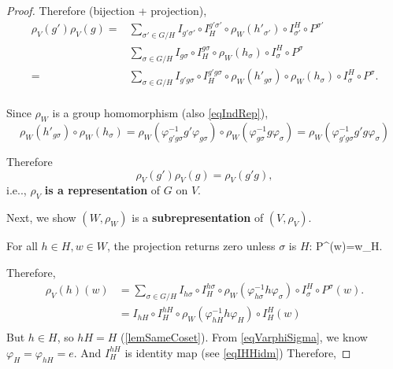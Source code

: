 \documentclass[12pt, letterpaper]{article}
\makeatletter
\newcommand\ie{i.e\@ifnextchar.{}{.\@}}
\newenvironment{eqlong}{\equation\aligned}{\endaligned\endequation}
\theoremstyle{definition}
\theoremstyle{remark}
\theoremstyle{definition}
\theoremstyle{plain}
\numberwithin{equation}{section}
\makeatother
\begin{document}
\begin{proof}
		Therefore (bijection + projection),
		\[\begin{aligned}
			\rho_V(g')\rho_V(g)=&\sum_{\sigma'\in G/H} I_{g'\sigma'}\circ I_{H}^{g'\sigma'}\circ \rho_W(h'_{\sigma'})\circ I^{H}_{\sigma'}\circ P^{\sigma'}\\
			&\sum_{\sigma\in G/H} I_{g\sigma}\circ I_{H}^{g\sigma}\circ \rho_W(h_\sigma)\circ I^{H}_{\sigma}\circ P^\sigma\\
			=&\sum_{\sigma\in G/H} I_{g'g\sigma}\circ I_{H}^{g'g\sigma}\circ \rho_W(h'_{g\sigma})\circ \rho_W(h_\sigma)\circ I^{H}_{\sigma}\circ P^\sigma.\\
		\end{aligned}\]
	
		Since $\rho_W$ is a group homomorphism (also \eqref{eqIndRep}),
		\[ \rho_W(h'_{g\sigma})\circ \rho_W(h_\sigma)= \rho_W(\varphi_{g'g\sigma}^{-1}g'\varphi_{g\sigma})\circ\rho_W(\varphi_{g\sigma}^{-1}g\varphi_{\sigma})=
		 \rho_W(\varphi_{g'g\sigma}^{-1}g'g\varphi_{\sigma})
		\]
		
		Therefore
		\[\rho_V(g')\rho_V(g)=\rho_V(g'g),\]
		\ie, $\rho_V$ \textbf{is a representation} of $G$ on $V$.
		
		Next, we show $(W,\rho_W)$ is a \textbf{subrepresentation} of $(V,\rho_V)$.

		For all $h\in H, w\in W$, the projection returns zero unless $\sigma$ is $H$:
		\begin{eqlong}\label{eqPsigmaw}
		P^\sigma(w)=w\delta_{H\sigma}.
		\end{eqlong}
		
		Therefore,
		\[\begin{aligned}
			\rho_V(h)(w)&=
			\sum_{\sigma\in G/H} I_{h\sigma}\circ I_{H}^{h\sigma}\circ \rho_W(\varphi_{h\sigma}^{-1}h\varphi_{\sigma})\circ I^{H}_{\sigma}\circ P^\sigma(w).\\
			&=
			I_{hH}\circ I_{H}^{hH}\circ \rho_W(\varphi_{hH}^{-1}h\varphi_{H})\circ I_H^H(w)\\
		\end{aligned}\]
		But $h\in H$, so $hH=H$ (\ref{lemSameCoset}). From \eqref{eqVarphiSigma},
		we know $\varphi_H=\varphi_{hH}=e$.
		And $I_H^{hH}$ is identity map (see \eqref{eqIHHidm})
		Therefore,
	

\end{proof}
\end{document}
